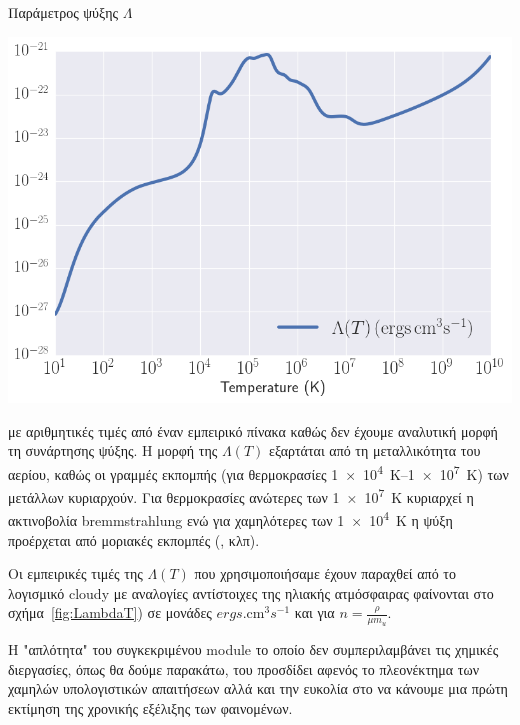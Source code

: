 		\begin{marginfigure}
		\caption{Παράμετρος ψύξης $\Lambda$}
		\includegraphics[width=1.0\linewidth]{Images/LambdaT}
		\label{fig:LambdaT}
	\end{marginfigure}
 με αριθμητικές τιμές από έναν εμπειρικό πίνακα καθώς δεν έχουμε αναλυτική μορφή τη συνάρτησης ψύξης. 
 Η μορφή της $\Lambda(T)$ εξαρτάται από τη μεταλλικότητα του αερίου, καθώς οι γραμμές εκπομπής (για θερμοκρασίες \SIrange{1e4}{1e7}{K}) των μετάλλων κυριαρχούν. Για θερμοκρασίες ανώτερες των \SI{1e7}{K} κυριαρχεί η ακτινοβολία bremmstrahlung ενώ για χαμηλότερες των \SI{1e4}{K} η ψύξη προέρχεται από μοριακές εκπομπές (, κλπ). 
 
 Οι εμπειρικές τιμές της $\Lambda(T)$ που χρησιμοποιήσαμε έχουν παραχθεί από το λογισμικό cloudy με αναλογίες αντίστοιχες της ηλιακής ατμόσφαιρας φαίνονται στο σχήμα~\ref{fig:LambdaT}) σε μονάδες $ \si{ergs.\cm^3 s^{-1}}$ και για  $n=\frac{\rho}{\mu m_u}$.

Η "απλότητα" του συγκεκριμένου module το οποίο δεν συμπεριλαμβάνει τις χημικές διεργασίες, όπως θα δούμε παρακάτω, του προσδίδει αφενός το πλεονέκτημα των χαμηλών υπολογιστικών απαιτήσεων αλλά και την ευκολία στο να κάνουμε μια πρώτη εκτίμηση της χρονικής εξέλιξης των φαινομένων.      
	
